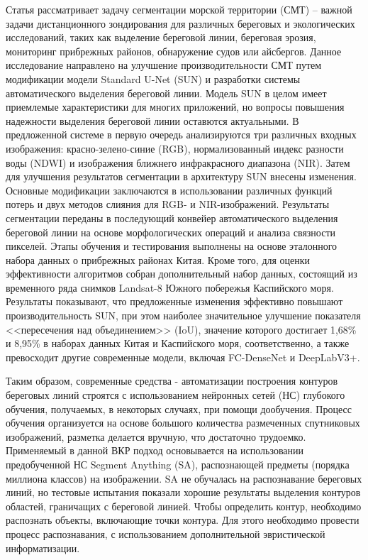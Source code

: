\documentclass[732,fontsize=14pt,final]{studrep}
\begin{document}
Статья \cite{b3} рассматривает задачу сегментации морской территории (СМТ) -- важной задачи дистанционного зондирования для различных береговых и экологических исследований, таких как выделение береговой линии, береговая эрозия, мониторинг прибрежных районов, обнаружение судов или айсбергов. Данное исследование направлено на улучшение производительности СМТ путем модификации модели Standard U-Net (SUN) и разработки системы автоматического выделения береговой линии. Модель SUN в целом имеет приемлемые характеристики для многих приложений, но вопросы повышения надежности выделения береговой линии оставются актуальными. В предложенной системе в первую очередь анализируются три различных входных изображения: красно-зелено-синие (RGB), нормализованный индекс разности воды (NDWI) и изображения ближнего инфракрасного диапазона (NIR).  Затем для улучшения результатов сегментации в архитектуру SUN внесены изменения. Основные модификации заключаются в использовании различных функций потерь и двух методов слияния для RGB- и NIR-изображений. Результаты сегментации переданы в последующий конвейер автоматического выделения береговой линии на основе морфологических операций и анализа связности пикселей. Этапы обучения и тестирования выполнены на основе эталонного набора данных о прибрежных районах Китая. Кроме того, для оценки эффективности алгоритмов собран дополнительный набор данных, состоящий из временного ряда снимков Landsat-8 Южного побережья Каспийского моря. Результаты показывают, что предложенные изменения эффективно повышают производительность SUN, при этом наиболее значительное улучшение показателя <<пересечения над объединением>> (IoU), значение которого достигает 1,68\% и 8,95\% в наборах данных Китая и Каспийского моря, соответственно, а также превосходит другие современные модели, включая FC-DenseNet и DeepLabV3+.

Таким образом, современные средства \cite{b1}-\cite{b3} автоматизации построения контуров береговых линий строятся с использованием нейронных сетей (НС) глубокого обучения, получаемых, в некоторых случаях, при помощи дообучения. Процесс обучения организуется на основе большого количества размеченных спутниковых изображений, разметка делается вручную, что достаточно трудоемко. Применяемый в данной ВКР подход основывается на использовании предобученной НС Segment Anything (SA), распознающей предметы (порядка миллиона классов) на изображении. SA не обучалась на распознавание береговых линий, но тестовые испытания показали хорошие результаты выделения контуров областей, граничащих с береговой линией. Чтобы определить контур, необходимо распознать объекты, включающие точки контура. Для этого необходимо провести процесс распознавания, с использованием дополнительной эвристической информатизации.
\end{document}

